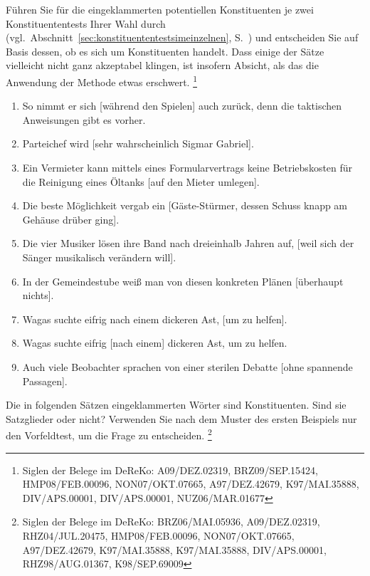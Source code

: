 \Uebungen

\Uebung \label{u101} Führen Sie für die eingeklammerten potentiellen Konstituenten je zwei Konstituententests Ihrer Wahl durch (vgl.\ Abschnitt~\ref{sec:konstituententestsimeinzelnen}, S.~\pageref{sec:konstituententestsimeinzelnen}) und entscheiden Sie auf Basis dessen, ob es sich um Konstituenten handelt.
Dass einige der Sätze vielleicht nicht ganz akzeptabel klingen, ist insofern Absicht, als das die Anwendung der Methode etwas erschwert.%
\footnote{Siglen der Belege im DeReKo: A09\slash DEZ.02319, BRZ09\slash SEP.15424, HMP08\slash FEB.00096, NON07\slash OKT.07665, A97\slash DEZ.42679, K97\slash MAI.35888, DIV\slash APS.00001, DIV\slash APS.00001, NUZ06\slash MAR.01677}

\begin{enumerate}\Lf
  \item So nimmt er sich [während den Spielen] auch zurück, denn die taktischen Anweisungen gibt es vorher.
  \item Parteichef wird [sehr wahrscheinlich Sigmar Gabriel].
  \item Ein Vermieter kann mittels eines Formularvertrags keine Betriebskosten für die Reinigung eines Öltanks [auf den Mieter umlegen].
  \item Die beste Möglichkeit vergab ein [Gäste-Stürmer, dessen Schuss knapp am Gehäuse drüber ging].
  \item Die vier Musiker lösen ihre Band nach dreieinhalb Jahren auf, [weil sich der Sänger musikalisch verändern will].
  \item In der Gemeindestube weiß man von diesen konkreten Plänen [überhaupt nichts].
  \item Wagas suchte eifrig nach einem dickeren Ast, [um zu helfen].
  \item Wagas suchte eifrig [nach einem] dickeren Ast, um zu helfen.
  \item Auch viele Beobachter sprachen von einer sterilen Debatte [ohne spannende Passagen].
\end{enumerate}

\Uebung \label{u102} Die in folgenden Sätzen eingeklammerten Wörter sind Konstituenten.
Sind sie Satzglieder oder nicht?
Verwenden Sie nach dem Muster des ersten Beispiels nur den Vorfeldtest, um die Frage zu entscheiden.%
\footnote{Siglen der Belege im DeReKo: BRZ06\slash MAI.05936, A09\slash DEZ.02319, RHZ04\slash JUL.20475, HMP08\slash FEB.00096, NON07\slash OKT.07665, A97\slash DEZ.42679, K97\slash MAI.35888, K97\slash MAI.35888, DIV\slash APS.00001, RHZ98\slash AUG.01367, K98\slash SEP.69009}

